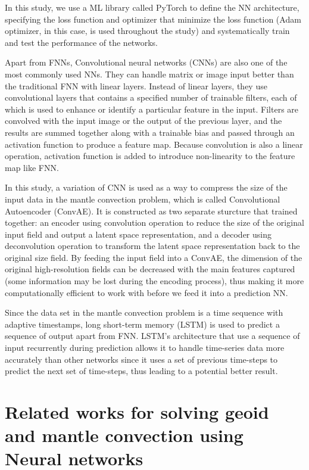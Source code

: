 In this study, we use a ML library called PyTorch to define the NN architecture, specifying the loss function and optimizer that minimize the loss function (Adam optimizer, in this case, is used throughout the study) and systematically train and test the performance of the networks.

Apart from FNNs, Convolutional neural networks (CNNs) are also one of the most commonly used NNs. They can handle matrix or image input better than the traditional FNN with linear layers. Instead of linear layers, they use convolutional layers that contains a specified number of trainable filters, each of which is used to enhance or identify a particular feature in the input. Filters are convolved with the input image or the output of the previous layer, and the results are summed together along with a trainable bias and passed through an activation function to produce a feature map. Because convolution is also a linear operation, activation function is added to introduce non-linearity to the feature map like FNN.

In this study, a variation of CNN is used as a way to compress the size of the input data in the mantle convection problem, which is called Convolutional Autoencoder (ConvAE). It is constructed as two separate sturcture that trained together: an encoder using convolution operation to reduce the size of the original input field and output a latent space representation, and a decoder using deconvolution operation to transform the latent space representation back to the original size field. By feeding the input field into a ConvAE, the dimension of the original high-resolution fields can be decreased with the main features captured (some information may be lost during the encoding process), thus making it more computationally efficient to work with before we feed it into a prediction NN.

Since the data set in the mantle convection problem is a time sequence with adaptive timestamps, long short-term memory (LSTM) is used to predict a sequence of output apart from FNN. LSTM's architecture that use a sequence of input recurrently during prediction allows it to handle time-series data more accurately than other networks since it uses a set of previous time-steps to predict the next set of time-steps, thus leading to a potential better result.


\section{Related works for solving geoid and mantle convection using Neural networks}

